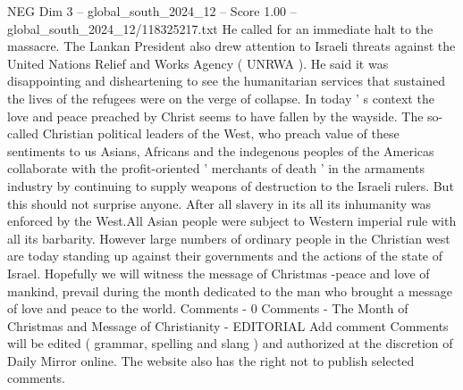 \begin{textsample}{NEG Dim 3 – global\_south\_2024\_12 – Score 1.00 – global\_south\_2024\_12/118325217.txt}
He called for an immediate halt to the massacre.
The Lankan President also drew attention to Israeli threats against the United Nations Relief and Works Agency ( UNRWA ).
He said it was disappointing and disheartening to see the humanitarian services that sustained the lives of the refugees were on the verge of collapse.
In today ' s context the love and peace preached by Christ seems to have fallen by the wayside.
The so-called Christian political leaders of the West, who preach value of these sentiments to us Asians, Africans and the indegenous peoples of the Americas collaborate with the profit-oriented ' merchants of death ' in the armaments industry by continuing to supply weapons of destruction to the Israeli rulers.
But this should not surprise anyone.
After all slavery in its all its inhumanity was enforced by the West.All Asian people were subject to Western imperial rule with all its barbarity.
However large numbers of ordinary people in the Christian west are today standing up against their governments and the actions of the state of Israel.
Hopefully we will witness the message of Christmas -peace and love of mankind, prevail during the month dedicated to the man who brought a message of love and peace to the world.
Comments - 0 Comments - The Month of Christmas and Message of Christianity - EDITORIAL Add comment Comments will be edited ( grammar, spelling and slang ) and authorized at the discretion of Daily Mirror online.
The website also has the right not to publish selected comments.

\end{textsample}
